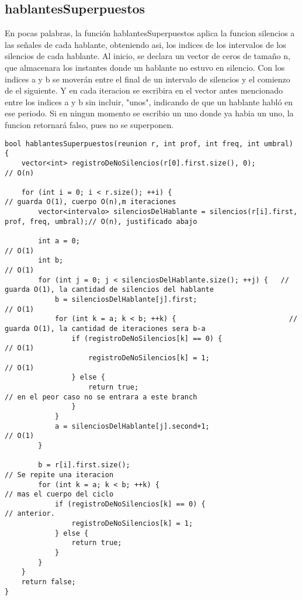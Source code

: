 \documentclass{article}
\begin{document}
\newpage
\subsection{hablantesSuperpuestos}
En pocas palabras, la función hablantesSuperpuestos aplica la funcion silencios a las señales de cada hablante,
obteniendo asi, los indices de los intervalos de los silencios de cada hablante.
Al inicio, se declara un vector de ceros de tamaño n, que almacenara los instantes donde un hablante no estuvo en
silencio. \newline
Con los indices a y b se moverán entre el final de un intervalo de silencios y el comienzo de el siguiente. Y en cada
iteracion se escribira en el vector antes mencionado entre los indices a y b sin incluir, "unos", indicando de que un
hablante habló en ese periodo. \newline
Si en ningun momento se escribio un uno donde ya habia un uno, la funcion retornará falso, pues no se superponen. \newline

\begin{lstlisting}
bool hablantesSuperpuestos(reunion r, int prof, int freq, int umbral) {
    vector<int> registroDeNoSilencios(r[0].first.size(), 0);                               // O(n)

    for (int i = 0; i < r.size(); ++i) {                                       // guarda O(1), cuerpo O(n),m iteraciones
        vector<intervalo> silenciosDelHablante = silencios(r[i].first, prof, freq, umbral);// O(n), justificado abajo

        int a = 0;                                                                         // O(1)
        int b;                                                                             // O(1)
        for (int j = 0; j < silenciosDelHablante.size(); ++j) {   // guarda O(1), la cantidad de silencios del hablante
            b = silenciosDelHablante[j].first;                                             // O(1)
            for (int k = a; k < b; ++k) {                           // guarda O(1), la cantidad de iteraciones sera b-a
                if (registroDeNoSilencios[k] == 0) {                                       // O(1)
                    registroDeNoSilencios[k] = 1;                                          // O(1)
                } else {
                    return true;                                          // en el peor caso no se entrara a este branch
                }
            }
            a = silenciosDelHablante[j].second+1;                                          // O(1)
        }

        b = r[i].first.size();                                                             // Se repite una iteracion
        for (int k = a; k < b; ++k) {                                                      // mas el cuerpo del ciclo
            if (registroDeNoSilencios[k] == 0) {                                           // anterior.
                registroDeNoSilencios[k] = 1;
            } else {
                return true;
            }
        }
    }
    return false;
}
\end{lstlisting}
\end{document}
